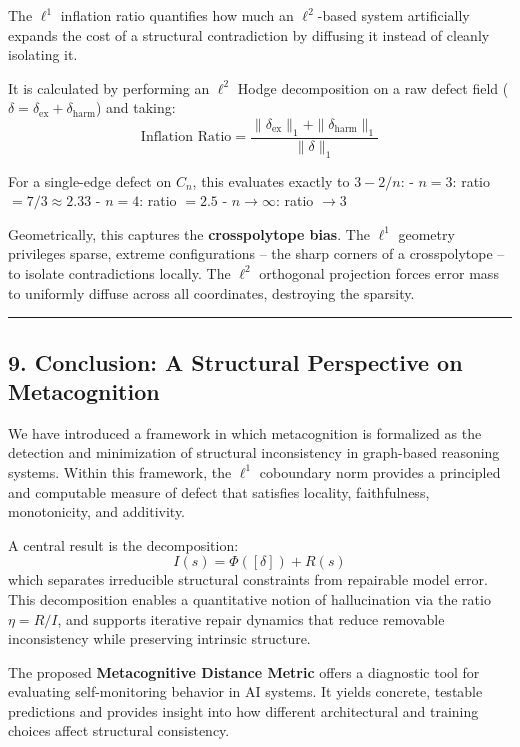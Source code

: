 \documentclass[
]{article}
\begin{document}
The \(\ell^1\) inflation ratio quantifies how much an \(\ell^2\)-based
system artificially expands the cost of a structural contradiction by
diffusing it instead of cleanly isolating it.

It is calculated by performing an \(\ell^2\) Hodge decomposition on a
raw defect field
(\(\delta = \delta_{\mathrm{ex}} + \delta_{\mathrm{harm}}\)) and taking:
\[\text{Inflation Ratio} = \frac{\|\delta_{\mathrm{ex}}\|_1 + \|\delta_{\mathrm{harm}}\|_1}{\|\delta\|_1}\]

For a single-edge defect on \(C_n\), this evaluates exactly to
\(3 - 2/n\): - \(n = 3\): ratio \(= 7/3 \approx 2.33\) - \(n = 4\):
ratio \(= 2.5\) - \(n \to \infty\): ratio \(\to 3\)

Geometrically, this captures the \textbf{crosspolytope bias}. The
\(\ell^1\) geometry privileges sparse, extreme configurations -- the
sharp corners of a crosspolytope -- to isolate contradictions locally.
The \(\ell^2\) orthogonal projection forces error mass to uniformly
diffuse across all coordinates, destroying the sparsity.

\begin{center}\rule{0.5\linewidth}{0.5pt}\end{center}

\subsection{9. Conclusion: A Structural Perspective on
Metacognition}\label{conclusion-a-structural-perspective-on-metacognition}

We have introduced a framework in which metacognition is formalized as
the detection and minimization of structural inconsistency in
graph-based reasoning systems. Within this framework, the \(\ell^1\)
coboundary norm provides a principled and computable measure of defect
that satisfies locality, faithfulness, monotonicity, and additivity.

A central result is the decomposition: \[I(s) = \Phi([\delta]) + R(s)\]
which separates irreducible structural constraints from repairable model
error. This decomposition enables a quantitative notion of hallucination
via the ratio \(\eta = R / I\), and supports iterative repair dynamics
that reduce removable inconsistency while preserving intrinsic
structure.

The proposed \textbf{Metacognitive Distance Metric} offers a diagnostic
tool for evaluating self-monitoring behavior in AI systems. It yields
concrete, testable predictions and provides insight into how different
architectural and training choices affect structural consistency.
\end{document}
